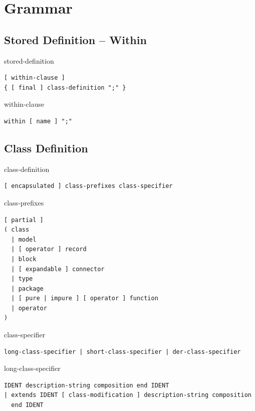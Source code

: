 \section{Grammar}\label{grammar}

\subsection{Stored Definition -- Within}\label{stored-definition-within}

\begin{production}{stored-definition}
\begin{lstlisting}
[ within-clause ]
{ [ final ] class-definition ";" }
\end{lstlisting}
\end{production}

\begin{production}{within-clause}
\begin{lstlisting}
within [ name ] ";"
\end{lstlisting}
\end{production}


\subsection{Class Definition}\label{class-definition}

\begin{production}{class-definition}
\begin{lstlisting}
[ encapsulated ] class-prefixes class-specifier
\end{lstlisting}
\end{production}

\begin{production}{class-prefixes}
\begin{lstlisting}
[ partial ]
( class
  | model
  | [ operator ] record
  | block
  | [ expandable ] connector
  | type
  | package
  | [ pure | impure ] [ operator ] function
  | operator
)
\end{lstlisting}
\end{production}

\begin{production}{class-specifier}
\begin{lstlisting}
long-class-specifier | short-class-specifier | der-class-specifier
\end{lstlisting}
\end{production}

\begin{production}{long-class-specifier}
\begin{lstlisting}
IDENT description-string composition end IDENT
| extends IDENT [ class-modification ] description-string composition
  end IDENT
\end{lstlisting}
\end{production}


